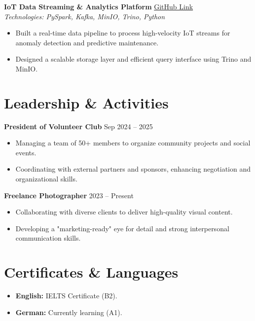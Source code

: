 \documentclass[a4paper,10pt]{article}
\begin{document}
\textbf{IoT Data Streaming & Analytics Platform} \hfill \href{https://github.com/BlueWhaleo5/IOT-Data-Streaming-Platform}{GitHub Link} \\
\textit{Technologies: PySpark, Kafka, MinIO, Trino, Python}
\begin{itemize}
    \item Built a real-time data pipeline to process high-velocity IoT streams for anomaly detection and predictive maintenance.
    \item Designed a scalable storage layer and efficient query interface using Trino and MinIO.
\end{itemize}

\section{Leadership \& Activities}
\textbf{President of Volunteer Club} \hfill Sep 2024 -- 2025
\begin{itemize}
    \item Managing a team of 50+ members to organize community projects and social events.
    \item Coordinating with external partners and sponsors, enhancing negotiation and organizational skills.
\end{itemize}

\textbf{Freelance Photographer} \hfill 2023 -- Present
\begin{itemize}
    \item Collaborating with diverse clients to deliver high-quality visual content.
    \item Developing a "marketing-ready" eye for detail and strong interpersonal communication skills.
\end{itemize}

\section{Certificates \& Languages}
\begin{itemize}
    \item \textbf{English:} IELTS Certificate (B2).
    \item \textbf{German:} Currently learning (A1).
\end{itemize}
\end{document}
